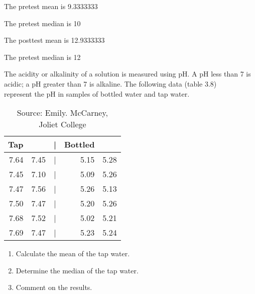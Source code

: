 \documentclass[11pt]{book}\usepackage[]{graphicx}\usepackage[]{color}
\begin{document}
\begin{exercises}
\begin{solution}
	The pretest mean is  9.3333333


	The pretest median is 10


	The posttest mean is	12.9333333


The pretest median is 12

	\end{solution}

	\begin{exercise}   %

	The acidity or alkalinity of a solution is measured using pH.  A pH less than 7 is acidic; a pH greater than 7 is alkaline.  The following data (table 3.8) \\ represent the pH in samples of bottled water and tap water.

\begin{table}[ht]
 \centering

	{\small{             %
	\caption{Source: Emily. McCarney, \\ Joliet College}
 \begin{tabular}{@{} rrcrr @{}}
   Tap &  & | & Bottled  & \\ \hline
   7.64 & 7.45 & | & 5.15 & 5.28 \\
   7.45 & 7.10 & | & 5.09 & 5.26 \\
   7.47 & 7.56 & | & 5.26 & 5.13 \\
   7.50 & 7.47 & | & 5.20 & 5.26 \\
   7.68 & 7.52 & | & 5.02 & 5.21 \\
   7.69 & 7.47 & | & 5.23 & 5.24 \\
    \hline
 \end{tabular}
 }}
   \label{tab:t3_15}
 \end{table}

\begin{enumerate}
 \item Calculate the mean  of the tap water.
 \item Determine the median of the tap water.
 \item Comment on the results.
\end{enumerate}
  \end{exercise}
%
%

\begin{exercise}  %


\end{exercise}
\end{exercises}
\end{document}

